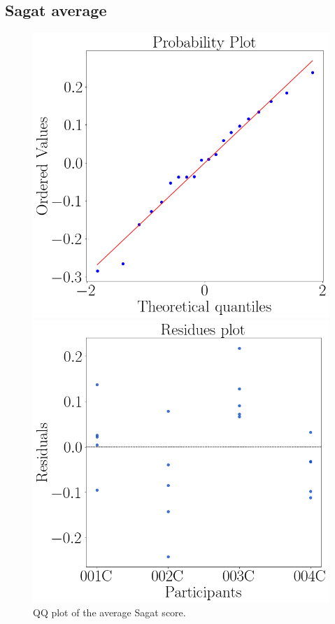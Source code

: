 \subsection{Sagat average}

\begin{figure}[!htb]
    \begin{minipage}{0.45\linewidth}
        \centering
        \includegraphics[width = \linewidth]{Resultados/Sagat/Figuras/png/qqplot_sagat_avg.png}
        \caption{QQ plot of the average Sagat score.}
        \label{fig:qqplot_sagat_average}
    \end{minipage}
    \begin{minipage}{0.1\linewidth}
        \hfill
    \end{minipage}
    \begin{minipage}{0.45\linewidth}
        \centering
        \includegraphics[width = \linewidth]{Resultados/Sagat/Figuras/png/residplot_sagat_avg.png}

\end{minipage}
\end{figure}
